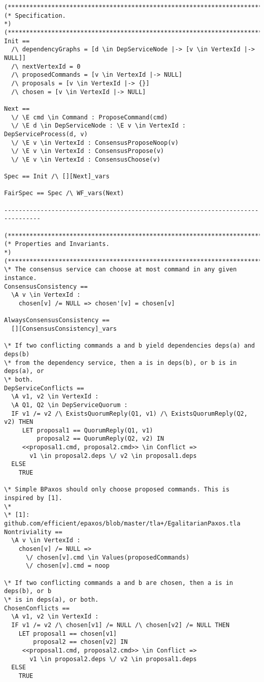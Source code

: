 \begin{verbatim}
(******************************************************************************)
(* Specification.                                                             *)
(******************************************************************************)
Init ==
  /\ dependencyGraphs = [d \in DepServiceNode |-> [v \in VertexId |-> NULL]]
  /\ nextVertexId = 0
  /\ proposedCommands = [v \in VertexId |-> NULL]
  /\ proposals = [v \in VertexId |-> {}]
  /\ chosen = [v \in VertexId |-> NULL]

Next ==
  \/ \E cmd \in Command : ProposeCommand(cmd)
  \/ \E d \in DepServiceNode : \E v \in VertexId : DepServiceProcess(d, v)
  \/ \E v \in VertexId : ConsensusProposeNoop(v)
  \/ \E v \in VertexId : ConsensusPropose(v)
  \/ \E v \in VertexId : ConsensusChoose(v)

Spec == Init /\ [][Next]_vars

FairSpec == Spec /\ WF_vars(Next)

--------------------------------------------------------------------------------

(******************************************************************************)
(* Properties and Invariants.                                                 *)
(******************************************************************************)
\* The consensus service can choose at most command in any given instance.
ConsensusConsistency ==
  \A v \in VertexId :
    chosen[v] /= NULL => chosen'[v] = chosen[v]

AlwaysConsensusConsistency ==
  [][ConsensusConsistency]_vars

\* If two conflicting commands a and b yield dependencies deps(a) and deps(b)
\* from the dependency service, then a is in deps(b), or b is in deps(a), or
\* both.
DepServiceConflicts ==
  \A v1, v2 \in VertexId :
  \A Q1, Q2 \in DepServiceQuorum :
  IF v1 /= v2 /\ ExistsQuorumReply(Q1, v1) /\ ExistsQuorumReply(Q2, v2) THEN
     LET proposal1 == QuorumReply(Q1, v1)
         proposal2 == QuorumReply(Q2, v2) IN
     <<proposal1.cmd, proposal2.cmd>> \in Conflict =>
       v1 \in proposal2.deps \/ v2 \in proposal1.deps
  ELSE
    TRUE

\* Simple BPaxos should only choose proposed commands. This is inspired by [1].
\*
\* [1]: github.com/efficient/epaxos/blob/master/tla+/EgalitarianPaxos.tla
Nontriviality ==
  \A v \in VertexId :
    chosen[v] /= NULL =>
      \/ chosen[v].cmd \in Values(proposedCommands)
      \/ chosen[v].cmd = noop

\* If two conflicting commands a and b are chosen, then a is in deps(b), or b
\* is in deps(a), or both.
ChosenConflicts ==
  \A v1, v2 \in VertexId :
  IF v1 /= v2 /\ chosen[v1] /= NULL /\ chosen[v2] /= NULL THEN
    LET proposal1 == chosen[v1]
        proposal2 == chosen[v2] IN
     <<proposal1.cmd, proposal2.cmd>> \in Conflict =>
       v1 \in proposal2.deps \/ v2 \in proposal1.deps
  ELSE
    TRUE


\end{verbatim}
